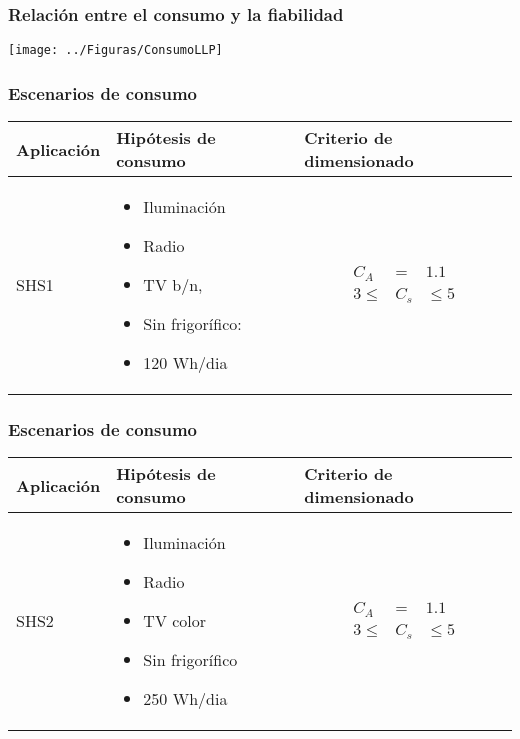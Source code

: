 \documentclass[serif, xcolor=dvipsnames]{beamer}
\begin{document}
\begin{frame}[plain]
\frametitle{Relación entre el consumo y la fiabilidad}

\begin{center}
\texttt{[image: ../Figuras/ConsumoLLP]}
\par\end{center}


\end{frame}

\begin{frame}
\frametitle{Escenarios de consumo}

\begin{tabular}{>{\centering}p{2cm}>{\centering}p{4cm}>{\centering}p{2cm}}
\toprule 
Aplicación & Hipótesis de consumo & Criterio de dimensionado\tabularnewline
\midrule
\midrule 
SHS1 & \begin{itemize}
\item Iluminación
\item Radio 
\item TV b/n, 
\item Sin frigorífico: 
\item 120 Wh/dia
\end{itemize}
 & \begin{eqnarray*}
C_{A} & = & 1.1\\
3\leq & C_{s} & \leq5\end{eqnarray*}
\tabularnewline
\bottomrule
\end{tabular}


\end{frame}

\begin{frame}
\frametitle{Escenarios de consumo}

\begin{tabular}{>{\centering}p{2cm}>{\centering}p{4cm}>{\centering}p{2cm}}
\toprule 
Aplicación & Hipótesis de consumo & Criterio de dimensionado\tabularnewline
\midrule
\midrule 
SHS2 & \begin{itemize}
\item Iluminación
\item Radio
\item TV color
\item Sin frigorífico
\item 250 Wh/dia
\end{itemize}
 & \begin{eqnarray*}
C_{A} & = & 1.1\\
3\leq & C_{s} & \leq5\end{eqnarray*}
\tabularnewline
\bottomrule
\end{tabular}


\end{frame}
\end{document}

